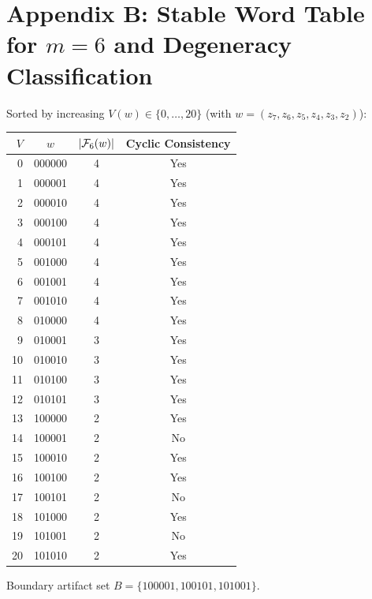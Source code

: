 \section{Appendix B: Stable Word Table for \texorpdfstring{$m=6$}{m=6} and Degeneracy Classification}

Sorted by increasing $V(w)\in\{0,\dots,20\}$ (with $w=(z_7,z_6,z_5,z_4,z_3,z_2)$):

\begin{center}
\begin{tabular}{r c c c}
\toprule
$V$ & $w$ & $\left\lvert \mathcal{F}_6(w)\right\rvert$ & Cyclic Consistency\\
\midrule
0  & 000000 & 4 & Yes\\
1  & 000001 & 4 & Yes\\
2  & 000010 & 4 & Yes\\
3  & 000100 & 4 & Yes\\
4  & 000101 & 4 & Yes\\
5  & 001000 & 4 & Yes\\
6  & 001001 & 4 & Yes\\
7  & 001010 & 4 & Yes\\
8  & 010000 & 4 & Yes\\
9  & 010001 & 3 & Yes\\
10 & 010010 & 3 & Yes\\
11 & 010100 & 3 & Yes\\
12 & 010101 & 3 & Yes\\
13 & 100000 & 2 & Yes\\
14 & 100001 & 2 & No\\
15 & 100010 & 2 & Yes\\
16 & 100100 & 2 & Yes\\
17 & 100101 & 2 & No\\
18 & 101000 & 2 & Yes\\
19 & 101001 & 2 & No\\
20 & 101010 & 2 & Yes\\
\bottomrule
\end{tabular}
\end{center}

Boundary artifact set $B=\{100001,100101,101001\}$.
